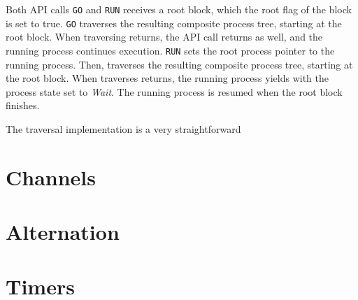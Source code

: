 Both API calls \texttt{GO} and \texttt{RUN} receives a root block, which the root flag of the block is set to true. \texttt{GO} traverses the resulting composite process tree, starting at the root block. When traversing returns, the API call returns as well, and the running process continues execution. \texttt{RUN} sets the root process pointer to the running process. Then, traverses the resulting composite process tree, starting at the root block. When traverses returns, the running process yields with the process state set to \textit{Wait}. The running process is resumed when the root block finishes.

The traversal implementation is a very straightforward

\section{Channels}

\section{Alternation}

\section{Timers}






